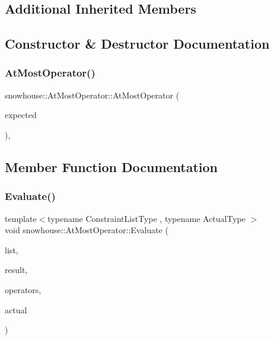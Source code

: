 \subsection*{Additional Inherited Members}


\subsection{Constructor \& Destructor Documentation}
\mbox{\label{structsnowhouse_1_1AtMostOperator_a46c7b3ee03af3a618fb8b17c215b61db}} 
\subsubsection{\texorpdfstring{AtMostOperator()}{AtMostOperator()}}
{\footnotesize\ttfamily snowhouse\+::\+At\+Most\+Operator\+::\+At\+Most\+Operator (\begin{DoxyParamCaption}\item[{unsigned int}]{expected }\end{DoxyParamCaption})\hspace{0.3cm}{\ttfamily [inline]}, {\ttfamily [explicit]}}



\subsection{Member Function Documentation}
\mbox{\label{structsnowhouse_1_1AtMostOperator_ab38aed2adc98483c2817c53a116a553a}} 
\subsubsection{\texorpdfstring{Evaluate()}{Evaluate()}}
{\footnotesize\ttfamily template$<$typename Constraint\+List\+Type , typename Actual\+Type $>$ \\
void snowhouse\+::\+At\+Most\+Operator\+::\+Evaluate (\begin{DoxyParamCaption}\item[{Constraint\+List\+Type \&}]{list,  }\item[{\mbox{\hyperlink{namespacesnowhouse_a719169b1315a13161c15f25e600a8f51}{Result\+Stack}} \&}]{result,  }\item[{\mbox{\hyperlink{namespacesnowhouse_adcb10e215e6a4bbcb35722a9c7270fc6}{Operator\+Stack}} \&}]{operators,  }\item[{const Actual\+Type \&}]{actual }\end{DoxyParamCaption})\hspace{0.3cm}{\ttfamily [inline]}}



